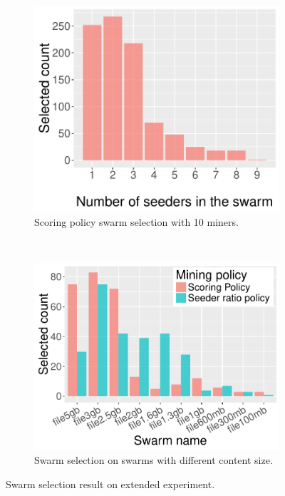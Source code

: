\begin{figure}[th!]
	\begin{adjustwidth}{-1.5cm}{}
		\begin{subfigure}[t]{0.6\textwidth}
			\centering
			\includegraphics[width=\textwidth]{pics/results/sc10_bar.pdf}
			\caption{Scoring policy swarm selection with 10 miners.}
			\label{fig:scattersc10}
		\end{subfigure}
		~
		\begin{subfigure}[t]{0.6\textwidth}
			\centering
			\includegraphics[width=\textwidth]{pics/results/scmulti_bar.pdf}
			\caption{Swarm selection on swarms with different content size.}
			\label{fig:scatterscmulti}
		\end{subfigure}
		\caption{Swarm selection result on extended experiment.}
	\end{adjustwidth}
\end{figure}

